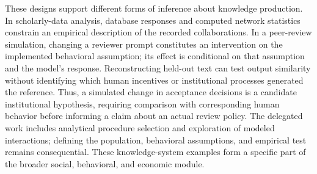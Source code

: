 These designs support different forms of inference about knowledge production. In scholarly-data analysis, database responses and computed network statistics constrain an empirical description of the recorded collaborations. In a peer-review simulation, changing a reviewer prompt constitutes an intervention on the implemented behavioral assumption; its effect is conditional on that assumption and the model's response. Reconstructing held-out text can test output similarity without identifying which human incentives or institutional processes generated the reference. Thus, a simulated change in acceptance decisions is a candidate institutional hypothesis, requiring comparison with corresponding human behavior before informing a claim about an actual review policy. The delegated work includes analytical procedure selection and exploration of modeled interactions; defining the population, behavioral assumptions, and empirical test remains consequential. These knowledge-system examples form a specific part of the broader social, behavioral, and economic module.
